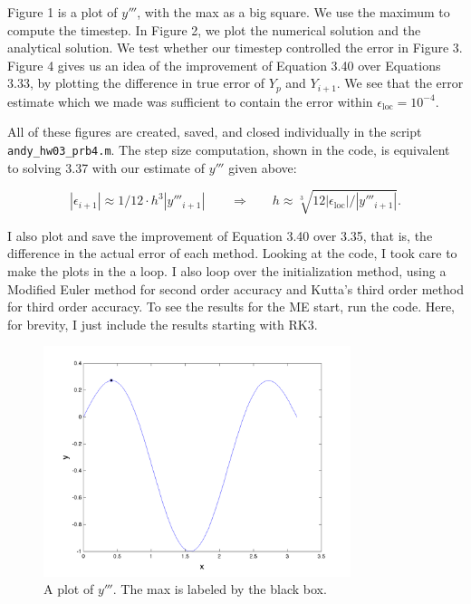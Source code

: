 \documentclass[11pt]{article}
\begin{document}
\begin{enumerate}
Figure 1 is a plot of $y'''$, with the max as a big square. We use the maximum to compute the timestep. In Figure 2, we plot the numerical solution and the analytical solution. We test whether our timestep controlled the error in Figure 3.
Figure 4 gives us an idea of the improvement of Equation 3.40 over Equations 3.33, by plotting the difference in true error of $Y_p$ and $Y_{i+1}$.
We see that the error estimate which we made was sufficient to contain the error within $\epsilon _\text{loc} = 10 ^{-4}$.

All of these figures are created, saved, and closed individually in the script \verb!andy_hw03_prb4.m!.
The step size computation, shown in the code, is equivalent to solving 3.37 with our estimate of $y'''$ given above:

\[ |\epsilon_{i+1} | \approx 1/12 \cdot h^3 | y''' _{i+1}| ~~~~~~~~~\Rightarrow~~~~~~~~ h \approx \sqrt[3]{12 |\epsilon_{\text{loc}}| / | y''' _{i+1}|} .\]

I also plot and save the improvement of Equation 3.40 over 3.35, that is, the difference in the actual error of each method.
Looking at the code, I took care to make the plots in the a loop.
I also loop over the initialization method, using a Modified Euler method for second order accuracy and Kutta's third order method for third order accuracy.
To see the results for the ME start, run the code.
Here, for brevity, I just include the results starting with RK3.

\pagebreak


\pagebreak

\begin{figure}[h!]
  \centering
  \includegraphics[width=0.8\textwidth]{andy_hw03_prb4_ytp.png}
  \caption{A plot of $y'''$. The max is labeled by the black box.}
\end{figure}


\end{enumerate}
\end{document}

